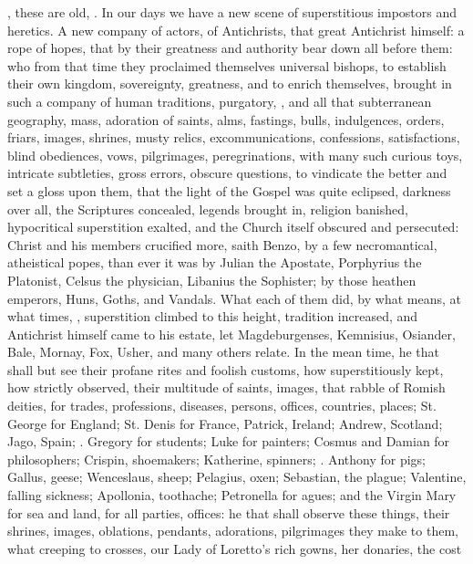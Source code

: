 {, these are old, . In our days we
have a new scene of superstitious impostors and heretics. A new company
of actors, of Antichrists, that great Antichrist himself: a rope of
hopes, that by their greatness and authority bear down all before them:
who from that time they proclaimed themselves universal bishops, to
establish their own kingdom, sovereignty, greatness, and to enrich
themselves, brought in such a company of human traditions, purgatory,
, and all that subterranean geography, mass,
adoration of saints, alms, fastings, bulls, indulgences, orders,
friars, images, shrines, musty relics, excommunications, confessions,
satisfactions, blind obediences, vows, pilgrimages, peregrinations,
with many such curious toys, intricate subtleties, gross errors,
obscure questions, to vindicate the better and set a gloss upon them,
that the light of the Gospel was quite eclipsed, darkness over all, the
Scriptures concealed, legends brought in, religion banished,
hypocritical superstition exalted, and the Church itself 
obscured and persecuted: Christ and his members crucified more, saith
Benzo, by a few necromantical, atheistical popes, than ever it was by
 Julian the Apostate, Porphyrius the Platonist, Celsus the
physician, Libanius the Sophister; by those heathen emperors, Huns,
Goths, and Vandals. What each of them did, by what means, at what
times, , superstition climbed to this height, tradition
increased, and Antichrist himself came to his estate, let
Magdeburgenses, Kemnisius, Osiander, Bale, Mornay, Fox, Usher, and many
others relate. In the mean time, he that shall but see their profane
rites and foolish customs, how superstitiously kept, how strictly
observed, their multitude of saints, images, that rabble of Romish
deities, for trades, professions, diseases, persons, offices,
countries, places; St. George for England; St. Denis for France,
Patrick, Ireland; Andrew, Scotland; Jago, Spain; \etc{}. Gregory for
students; Luke for painters; Cosmus and Damian for philosophers;
Crispin, shoemakers; Katherine, spinners; \etc{}. Anthony for pigs; Gallus,
geese; Wenceslaus, sheep; Pelagius, oxen; Sebastian, the plague;
Valentine, falling sickness; Apollonia, toothache; Petronella for
agues; and the Virgin Mary for sea and land, for all parties, offices:
he that shall observe these things, their shrines, images, oblations,
pendants, adorations, pilgrimages they make to them, what creeping to
crosses, our Lady of Loretto's rich gowns, her donaries, the cost
}
